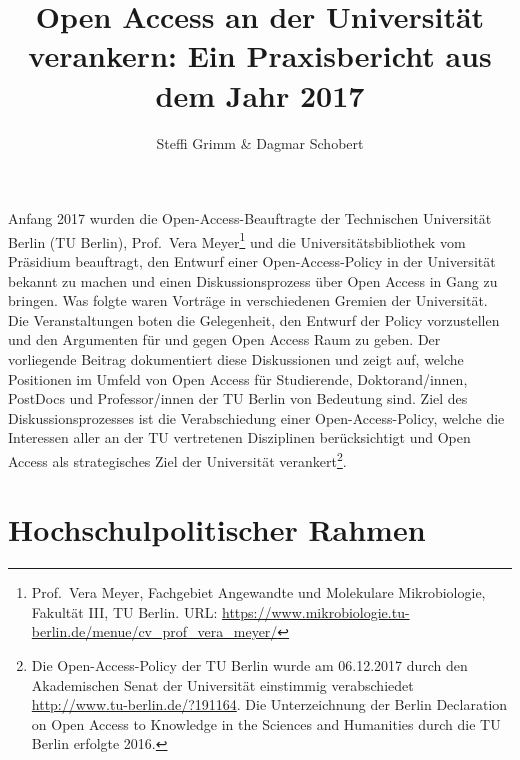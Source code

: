 \documentclass[a4paper,
fontsize=11pt,
oneside,
numbers=noperiodatend,
parskip=half-,
bibliography=totoc,
final
]{scrartcl}
\title{\LARGE{Open Access an der Universität verankern: Ein Praxisbericht aus dem Jahr 2017}} %
\author{Steffi Grimm \& Dagmar Schobert} %
\date{}
\begin{document}
\maketitle
\thispagestyle{fancyplain} 


Anfang 2017 wurden die Open-Access-Beauftragte der Technischen
Universität Berlin (TU Berlin), Prof.~Vera Meyer\footnote{Prof.~Vera
  Meyer, Fachgebiet Angewandte und Molekulare Mikrobiologie, Fakultät
  III, TU Berlin. URL:
  \url{https://www.mikrobiologie.tu-berlin.de/menue/cv_prof_vera_meyer/}}
und die Universitätsbibliothek vom Präsidium beauftragt, den Entwurf
einer Open-Access-Policy in der Universität bekannt zu machen und einen
Diskussionsprozess über Open Access in Gang zu bringen. Was folgte waren
Vorträge in verschiedenen Gremien der Universität. Die Veranstaltungen
boten die Gelegenheit, den Entwurf der Policy vorzustellen und den
Argumenten für und gegen Open Access Raum zu geben. Der vorliegende
Beitrag dokumentiert diese Diskussionen und zeigt auf, welche Positionen
im Umfeld von Open Access für Studierende, Doktorand/innen, PostDocs und
Professor/innen der TU Berlin von Bedeutung sind. Ziel des
Diskussionsprozesses ist die Verabschiedung einer Open-Access-Policy,
welche die Interessen aller an der TU vertretenen Disziplinen
berücksichtigt und Open Access als strategisches Ziel der Universität
verankert\footnote{Die Open-Access-Policy der TU Berlin wurde am
  06.12.2017 durch den Akademischen Senat der Universität einstimmig
  verabschiedet \url{http://www.tu-berlin.de/?191164}. Die
  Unterzeichnung der Berlin Declaration on Open Access to Knowledge in
  the Sciences and Humanities durch die TU Berlin erfolgte 2016.}.

\hypertarget{hochschulpolitischer-rahmen}{%
\section*{Hochschulpolitischer
Rahmen}\label{hochschulpolitischer-rahmen}}
\end{document}

